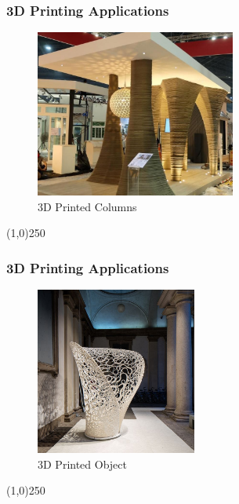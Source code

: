 \begin{frame}
\frametitle{3D Printing Applications}
\begin{figure}[h]
	\centering
	\includegraphics[height=5.5cm]{img/3DPrinting/3dprintColumn.jpg}
	\caption[3D Printed Columns]{3D Printed Columns}
	\label{fig:multiple3dprintcolumn}
\end{figure}
\end{frame}
\begin{center}\line(1,0){250}\end{center}




\begin{frame}
\frametitle{3D Printing Applications}
\begin{figure}[h]
	\centering
	\includegraphics[height=5.5cm]{img/3DPrinting/3dprintedObject.jpg}
	\caption[3D Printed Object]{3D Printed Object}
	\label{fig:3dprintObject}
\end{figure}
\end{frame}
\begin{center}\line(1,0){250}\end{center}

